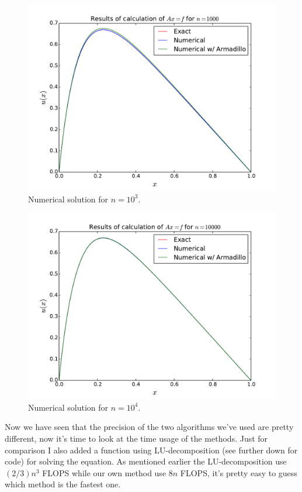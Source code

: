 \documentclass[english, 11pt]{article}
\begin{document}
\begin{figure}[H]
    \centering
    \includegraphics[width = .9\textwidth]{d_n_1000.pdf}
    \caption{Numerical solution for $n=10^3$.}
    \label{fig:sol103}
\end{figure}

\begin{figure}[H]
    \centering
    \includegraphics[width = .9\textwidth]{d_n_10000.pdf}
    \caption{Numerical solution for $n=10^4$.}
    \label{fig:sol104}
\end{figure}

Now we have seen that the precision of the two algorithms we've used are pretty different, now it's time to look at the time usage of the methods. Just for comparison I also added a function using LU-decomposition (see further down for code) for solving the equation. As mentioned earlier the LU-decomposition use $(2/3)n^3$ FLOPS while our own method use $8n$ FLOPS, it's pretty easy to guess which method is the fastest one.
\end{document}
